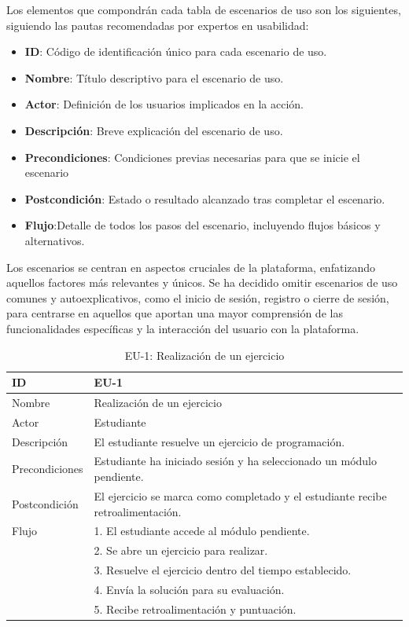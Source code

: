 Los elementos que compondrán cada tabla de escenarios de uso son los siguientes, siguiendo las pautas recomendadas por expertos en usabilidad:

\begin{itemize}
    \item \textbf{ID}: Código de identificación único para cada escenario de uso.
    \item \textbf{Nombre}: Título descriptivo para el escenario de uso.
    \item \textbf{Actor}: Definición de los usuarios implicados en la acción.
    \item \textbf{Descripción}: Breve explicación del escenario de uso. 
    \item \textbf{Precondiciones}: Condiciones previas necesarias para que se inicie el escenario
    \item \textbf{Postcondición}: Estado o resultado alcanzado tras completar el escenario.
    \item \textbf{Flujo}:Detalle de todos los pasos del escenario, incluyendo flujos básicos y alternativos.
\end{itemize}

Los escenarios se centran en aspectos cruciales de la plataforma, enfatizando aquellos factores más relevantes y únicos. Se ha decidido omitir escenarios de uso comunes y autoexplicativos, como el inicio de sesión, registro o cierre de sesión, para centrarse en aquellos que aportan una mayor comprensión de las funcionalidades específicas y la interacción del usuario con la plataforma.

\begin{table}[H]
    \centering
    \begin{tabularx}{\textwidth}{|l|X|}
    \hline
    ID & EU-1 \\
    \hline
    Nombre & Realización de un ejercicio \\
    \hline
    Actor & Estudiante \\
    \hline
    Descripción & El estudiante resuelve un ejercicio de programación. \\
    \hline
    Precondiciones & Estudiante ha iniciado sesión y ha seleccionado un módulo pendiente. \\
    \hline
    Postcondición & El ejercicio se marca como completado y el estudiante recibe retroalimentación. \\
    \hline
    Flujo & 
    1. El estudiante accede al módulo pendiente. \\
    & 2. Se abre un ejercicio para realizar. \\
    & 3. Resuelve el ejercicio dentro del tiempo establecido. \\
    & 4. Envía la solución para su evaluación. \\
    & 5. Recibe retroalimentación y puntuación. \\
    \hline
    \end{tabularx}
    \caption{EU-1: Realización de un ejercicio}
\end{table}

